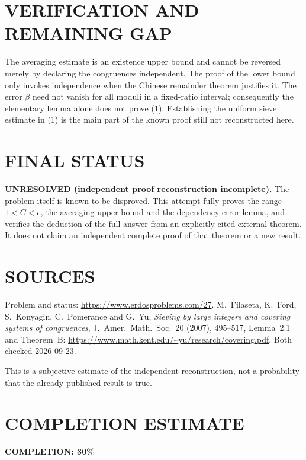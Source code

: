 \section{VERIFICATION AND REMAINING GAP}
The averaging estimate is an existence upper bound and cannot be
reversed merely by declaring the congruences independent. The proof of
the lower bound only invokes independence when the Chinese remainder
theorem justifies it. The error $\beta$ need not vanish for all moduli
in a fixed-ratio interval; consequently the elementary lemma alone
does not prove (1). Establishing the uniform sieve estimate in (1)
is the main part of the known proof still not reconstructed here.

\section{FINAL STATUS}
\textbf{UNRESOLVED (independent proof reconstruction incomplete).}
The problem itself is known to be disproved. This attempt fully proves
the range $1<C<e$, the averaging upper bound and the dependency-error
lemma, and verifies the deduction of the full answer from an explicitly
cited external theorem. It does not claim an independent complete proof
of that theorem or a new result.

\section{SOURCES}
Problem and status: \url{https://www.erdosproblems.com/27}.
M.~Filaseta, K.~Ford, S.~Konyagin, C.~Pomerance and G.~Yu,
\emph{Sieving by large integers and covering systems of congruences},
J.~Amer.~Math.~Soc.~20 (2007), 495--517, Lemma~2.1 and Theorem~B:
\url{https://www.math.kent.edu/~yu/research/covering.pdf}.
Both checked 2026-09-23.

This is a subjective estimate of the independent reconstruction,
not a probability that the already published result is true.

\section{COMPLETION ESTIMATE}
\textbf{COMPLETION: 30\%}
